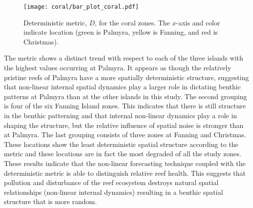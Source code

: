\begin{figure}[htbp] %
   \centering
   \texttt{[image: coral/bar\_plot\_coral.pdf]} 
   \caption{Deterministic metric, $D$, for the coral zones. The $x$-axis and color indicate location (green is Palmyra, yellow is Fanning, and red is Christmas).}
   \label{coral_bar}
\end{figure}

The metric shows a distinct trend with respect to each of the three islands with the highest values occurring at Palmyra. It appears as though the relatively pristine reefs of Palmyra have a more spatially deterministic structure, suggesting that non-linear internal spatial dynamics play a larger role in dictating benthic patterns at Palmyra than at the other islands in this study. The second grouping is four of the six Fanning Island zones. This indicates that there is still structure in the benthic patterning and that internal non-linear dynamics play a role in shaping the structure, but the relative influence of spatial noise is stronger than at Palmyra. The last grouping consists of three zones at Fanning and Christmas. These locations show  the least deterministic spatial structure according to the metric and these locations are in fact the most degraded of all the study zones. These results indicate that the non-linear forecasting technique coupled with the deterministic metric is able to distinguish relative reef health. This suggests that pollution and disturbance of the reef ecosystem destroys natural spatial relationships (non-linear internal dynamics) resulting in a benthic spatial structure that is more random.



